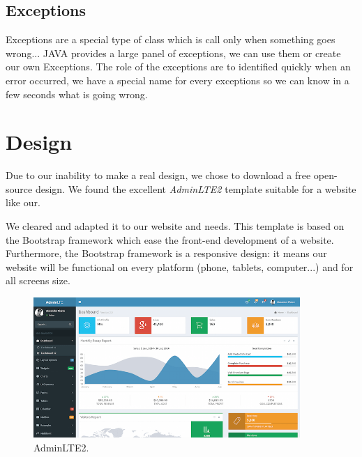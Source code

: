\subsection{Exceptions}

Exceptions are a special type of class which is call only when something goes wrong...
JAVA provides a large panel of exceptions, we can use them or create our own Exceptions.
The role of the exceptions are to identified quickly when an error occurred, we have a special name for every exceptions so we can know in a few seconds what is going wrong.


\section{Design}
Due to our inability to make a real design, we chose to download a free open-source design. We found the excellent \textit{AdminLTE2} template suitable for a website like our.
\newline

We cleared and adapted it to our website and needs.
This template is based on the Bootstrap framework which ease the front-end development of a website. Furthermore, the Bootstrap framework is a responsive design: it means our website will be functional on every platform (phone, tablets, computer...) and for all screens size.

\begin{figure}[!ht]
  \caption{AdminLTE2.}
  \centering
    \includegraphics[width=0.9\textwidth]{img/design.png}
\end{figure}





